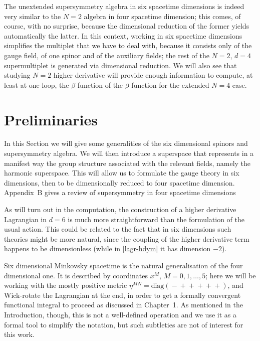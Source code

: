 The unextended supersymmetry algebra in six spacetime dimensions is indeed very similar to the $N=2$ algebra in four spacetime dimension; this comes, of course, with no surprise, because the dimensional reduction of the former yields automatically the latter. In this context, working in six spacetime dimensions simplifies the multiplet that we have to deal with, because it consists only of the gauge field, of one spinor and of the auxiliary fields; the rest of the $N=2$, $d=4$ supermultiplet is  generated via dimensional reduction.
We will also see that studying $N=2$ higher derivative \sym{} will provide enough information to compute, at least at one-loop, the  $\beta$ function of the $\beta$ function for the extended $N=4$  case.







\section{Preliminaries}

In this Section we will give some generalities of the six dimensional spinors and supersymmetry algebra. We will then introduce a superspace that represents in a manifest way the group structure associated with the relevant fields, namely the harmonic superspace. This will allow us to formulate the gauge theory in six dimensions, then to be dimensionally reduced to four spacetime dimension.
Appendix~B gives a review of supersymmetry in four spacetime dimensions


As will turn out in the computation, the construction of a higher derivative Lagrangian in $d=6$ is much more straightforward than the formulation of the usual \ym{} action. This could be related to the fact that in six dimensions such theories might be more natural, since the coupling of the higher derivative term happens to be dimensionless (while in \eqref{lagr-hdym} it has dimension $-2$).


Six dimensional Minkovsky spacetime is the natural generalisation of the four dimensional one. It is described by coordinates $x^M$, $M=0,1,\ldots,5$; here we will be working with the mostly positive metric $\eta^{MN} = \text{diag}({}-{}+{}+{}+{}+{}+{})$, and Wick-rotate the Lagrangian at the end, in order to get a formally convergent 
functional integral to proceed as discussed in Chapter~1. As mentioned in the Introduction, though, this is not a well-defined operation and we use it as a formal tool to simplify the notation, but such subtleties are not of interest for this work.


